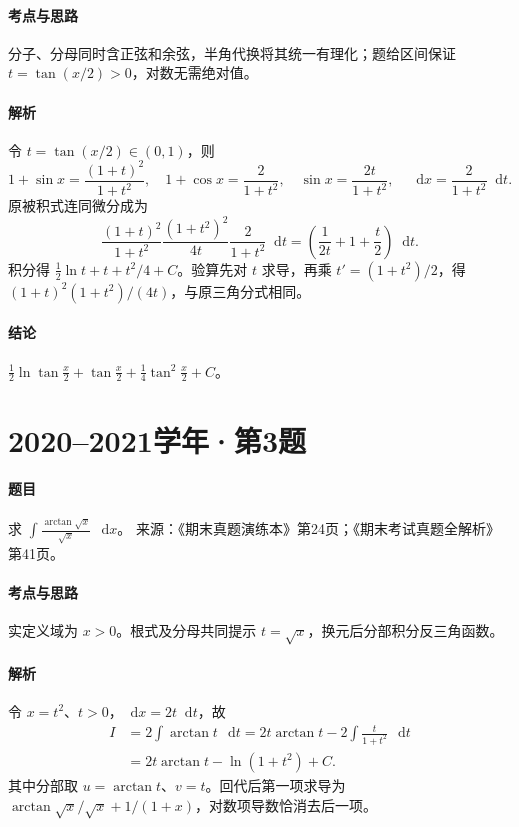 \documentclass[UTF8,fontset=fandol,12pt,oneside,openany]{ctexrep}
\newcommand{\dd}{\mathop{}\!\mathrm d}
\theoremstyle{definition}
\begin{document}
\paragraph{考点与思路}分子、分母同时含正弦和余弦，半角代换将其统一有理化；题给区间保证 $t=\tan(x/2)>0$，对数无需绝对值。
\paragraph{解析}令 $t=\tan(x/2)\in(0,1)$，则
\[
1+\sin x=\frac{(1+t)^2}{1+t^2},\quad
1+\cos x=\frac2{1+t^2},\quad
\sin x=\frac{2t}{1+t^2},\quad
\dd x=\frac2{1+t^2}\dd t.
\]
原被积式连同微分成为
\[
\frac{(1+t)^2}{1+t^2}\frac{(1+t^2)^2}{4t}
\frac2{1+t^2}\dd t
=\left(\frac1{2t}+1+\frac t2\right)\dd t.
\]
积分得 $\frac12\ln t+t+t^2/4+C$。验算先对 $t$ 求导，再乘 $t'=(1+t^2)/2$，得 $(1+t)^2(1+t^2)/(4t)$，与原三角分式相同。
\paragraph{结论}$\boxed{\frac12\ln\tan\frac x2+\tan\frac x2+\frac14\tan^2\frac x2+C}$。

\par\addvspace{18pt}\noindent\begin{minipage}{\linewidth}
\section{2020--2021学年·第3题}
\paragraph{题目}求 $\displaystyle\int\frac{\arctan\sqrt{x}}{\sqrt{x}}\,\dd x$。
来源：《期末真题演练本》第24页；《期末考试真题全解析》第41页。
\end{minipage}\par
\paragraph{考点与思路}实定义域为 $x>0$。根式及分母共同提示 $t=\sqrt{x}$，换元后分部积分反三角函数。
\paragraph{解析}令 $x=t^2$、$t>0$，$\dd x=2t\dd t$，故
\begin{align*}
I&=2\int\arctan t\,\dd t
=2t\arctan t-2\int\frac{t}{1+t^2}\,\dd t\\
&=2t\arctan t-\ln(1+t^2)+C.
\end{align*}
其中分部取 $u=\arctan t$、$v=t$。回代后第一项求导为 $\arctan\sqrt{x}/\sqrt{x}+1/(1+x)$，对数项导数恰消去后一项。
\end{document}
